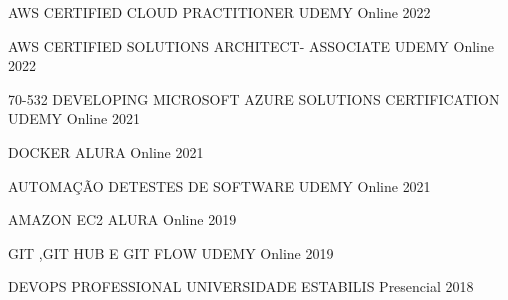 

\begin{cvhonors}

  \cvhonor
    {AWS CERTIFIED CLOUD PRACTITIONER} %
    {UDEMY} %
    {Online} %
    {2022} %

  \cvhonor
    {AWS CERTIFIED SOLUTIONS ARCHITECT- ASSOCIATE} %
    {UDEMY} %
    {Online} %
    {2022} %

  \cvhonor
    {70-532 DEVELOPING MICROSOFT AZURE SOLUTIONS CERTIFICATION} %
    {UDEMY} %
    {Online} %
    {2021} %

  \cvhonor
    {DOCKER} %
    {ALURA} %
    {Online} %
    {2021} %

  \cvhonor
    {AUTOMAÇÃO DETESTES DE SOFTWARE} %
    {UDEMY} %
    {Online} %
    {2021} %

  \cvhonor
    {AMAZON EC2} %
    {ALURA} %
    {Online} %
    {2019} %

  \cvhonor
    {GIT ,GIT HUB E GIT FLOW} %
    {UDEMY} %
    {Online} %
    {2019} %

  \cvhonor
    {DEVOPS PROFESSIONAL} %
    {UNIVERSIDADE ESTABILIS} %
    {Presencial} %
    {2018} %


\end{cvhonors}
